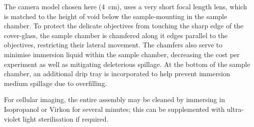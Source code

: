 The camera model chosen here (\SI{4}{\centi\metre}), uses a very short focal length lens, which is matched to the height of void below the sample-mounting in the sample chamber.
To protect the delicate objectives from touching the sharp edge of the cover-glass, the sample chamber is chamfered along it edges parallel to the objectives, restricting their lateral movement.
The chamfers also serve to minimise immersion liquid within the sample chamber, decreasing the cost per experiment as well as mitigating deleterious spillage.
At the bottom of the sample chamber, an additional drip tray is incorporated to help prevent immersion medium spillage due to overfilling.

For cellular imaging, the entire assembly may be cleaned by immersing in Isopropanol or Virkon for several minutes; this can be supplemented with ultra-violet light sterilisation if required.

